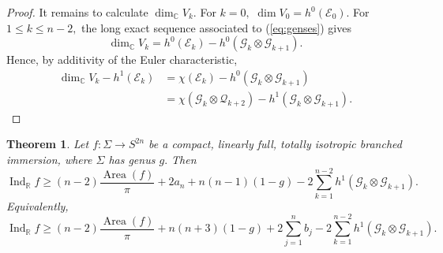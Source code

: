 \documentclass[11pt]{article}
\newtheorem{theorem}{Theorem}[section]
\theoremstyle{definition}
\newcommand{\R}{\mathbb{R}}
\newcommand{\C}{\mathbb{C}}
\numberwithin{equation}{section}
\begin{document}
\begin{proof}
	It remains to calculate $\dim_\C V_k.$ For $k = 0,$  $\dim V_0 = h^0(\mathcal{E}_0).$ For $1 \leq k \leq n-2,$ the long exact sequence associated to (\ref{eq:genses}) gives
	\begin{equation*}
		\dim_{\C}V_k = h^0(\mathcal{E}_k) - h^0(\mathcal{G}_k\otimes\mathcal{G}_{k+1}).
	\end{equation*}
	Hence, by additivity of the Euler characteristic,
	\begin{equation*}
		\begin{aligned}
			\dim_{\C}V_k-h^1(\mathcal{E}_k) & = \chi(\mathcal{E}_k) - h^0(\mathcal{G}_k\otimes\mathcal{G}_{k+1})                          \\
			 & = \chi(\mathcal{G}_k\otimes\mathcal{Q}_{k+2}) - h^1(\mathcal{G}_k\otimes\mathcal{G}_{k+1}).
		\end{aligned}
	\end{equation*}
\end{proof}

\newpage

\begin{theorem}\label{thm:genlowbound}
	Let $f: \Sigma \to S^{2n}$ be a compact, linearly full, totally isotropic branched immersion, where $\Sigma$ has genus $g.$ Then
	\begin{equation*}
		\operatorname{Ind}_\R f \geq (n-2) \frac{\operatorname{Area}(f)}{\pi} + 2a_n + n(n-1)(1-g) - 2 \sum_{k=1}^{n-2} h^1(\mathcal{G}_k \otimes \mathcal{G}_{k+1}).
	\end{equation*}
	Equivalently,
	\begin{equation*}
		\operatorname{Ind}_\R f \geq (n-2)\frac{\operatorname{Area}(f)}{\pi} + n(n+3)(1-g) + 2 \sum_{j=1}^n b_j - 2 \sum_{k=1}^{n-2} h^1(\mathcal{G}_k \otimes \mathcal{G}_{k+1}).
	\end{equation*}
\end{theorem}
\end{document}
